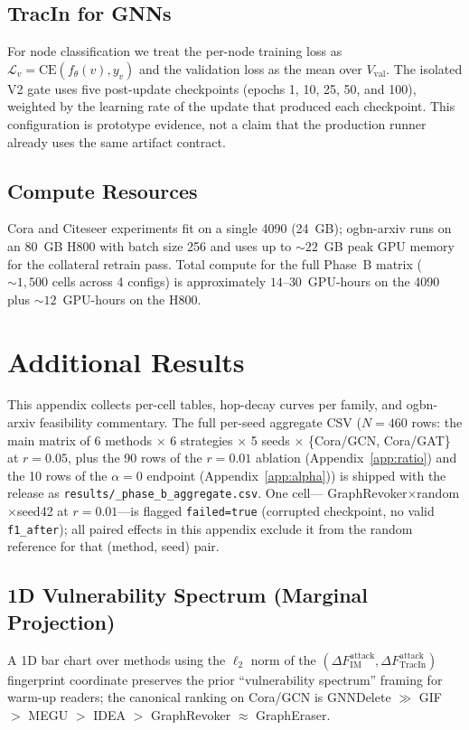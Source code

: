 \subsection{TracIn for GNNs}
For node classification we treat the per-node training loss as
$\mathcal{L}_v = \mathrm{CE}(f_\theta(v), y_v)$ and the validation loss
as the mean over $V_{\mathrm{val}}$.  The isolated V2 gate uses five
post-update checkpoints (epochs 1, 10, 25, 50, and 100), weighted by the
learning rate of the update that produced each checkpoint.  This configuration
is prototype evidence, not a claim that the production runner already uses the
same artifact contract.

\subsection{Compute Resources}
Cora and Citeseer experiments fit on a single 4090 (24~GB); ogbn-arxiv
runs on an 80~GB H800 with batch size 256 and uses up to
${\sim}22$~GB peak GPU memory for the collateral retrain pass.
Total compute for the full Phase~B matrix (${\sim}1{,}500$ cells
across 4 configs) is approximately $14$--$30$~GPU-hours on the 4090
plus ${\sim}12$~GPU-hours on the H800.

\section{Additional Results}
\label{app:results}

This appendix collects per-cell tables, hop-decay curves per family,
and ogbn-arxiv feasibility commentary. The full per-seed aggregate
CSV ($N{=}460$ rows: the main matrix of 6 methods $\times$ 6
strategies $\times$ 5 seeds $\times$ \{Cora/GCN, Cora/GAT\} at
$r{=}0.05$, plus the 90 rows of the $r{=}0.01$ ablation
(Appendix~\ref{app:ratio}) and the 10 rows of the $\alpha{=}0$
endpoint (Appendix~\ref{app:alpha})) is shipped with the release as
\texttt{results/\_phase\_b\_aggregate.csv}. One cell---
GraphRevoker$\times$random$\times$seed42 at $r{=}0.01$---is flagged
\texttt{failed{=}true} (corrupted checkpoint, no valid
\texttt{f1\_after}); all paired effects in this appendix exclude it
from the random reference for that (method, seed) pair.

\subsection{1D Vulnerability Spectrum (Marginal Projection)}
\label{app:results-1d}
A 1D bar chart over methods using the $\ell_2$ norm of the
$(\Delta F^{\text{attack}}_{\mathrm{IM}},
\Delta F^{\text{attack}}_{\mathrm{TracIn}})$ fingerprint coordinate
preserves the prior ``vulnerability spectrum'' framing for warm-up
readers; the canonical ranking on Cora/GCN is GNNDelete $\gg$ GIF
$>$ MEGU $>$ IDEA $>$ GraphRevoker $\approx$ GraphEraser.

